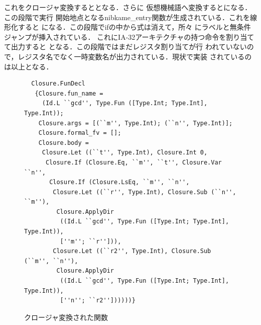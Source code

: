 \documentclass[a4paper,titlepage,disablejfam]{jsbook}
\begin{document}
これをクロージャ変換するととなる．さらに
仮想機械語へ変換するとになる．この段階で実行
開始地点となるnibkame\_entry関数が生成されている．これを線形化すると
になる．この段階でifの中から式は消えて，所々
にラベルと無条件ジャンプが挿入されている．
これにIA-32アーキテクチャの持つ命令を割り当てて出力すると
となる．この段階ではまだレジスタ割り当てが行
われていないので，レジスタ名でなく一時変数名が出力されている．現状で実装
されているのは以上となる．

\begin{figure}[htb]
\begin{center} 
\begin{lstlisting}
  Closure.FunDecl
   {Closure.fun_name =
     (Id.L ``gcd'', Type.Fun ([Type.Int; Type.Int], Type.Int));
    Closure.args = [(``m'', Type.Int); (``n'', Type.Int)];
    Closure.formal_fv = [];
    Closure.body =
     Closure.Let ((``t'', Type.Int), Closure.Int 0,
      Closure.If (Closure.Eq, ``m'', ``t'', Closure.Var ``n'',
       Closure.If (Closure.LsEq, ``m'', ``n'',
        Closure.Let ((``r'', Type.Int), Closure.Sub (``n'', ``m''),
         Closure.ApplyDir
          ((Id.L ``gcd'', Type.Fun ([Type.Int; Type.Int], Type.Int)),
          [''m''; ``r''])),
        Closure.Let ((``r2'', Type.Int), Closure.Sub (``m'', ``n''),
         Closure.ApplyDir
          ((Id.L ``gcd'', Type.Fun ([Type.Int; Type.Int], Type.Int)),
          [''n''; ``r2''])))))}
\end{lstlisting}
\caption{クロージャ変換された関数}\label{fig:impl-sample-closure}
\end{center}
\end{figure}
\end{document}
